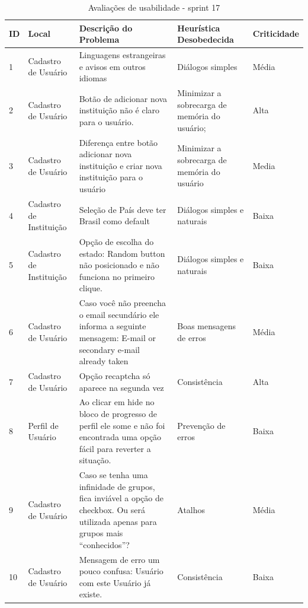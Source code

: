 \begin{table}[h!]

\begin{tabular}{|l|p{3cm}|p{6cm}|p{3cm}|l|}
\hline
\textbf{ID} & \textbf{Local} & \textbf{Descrição do Problema}                                                                                     & \textbf{Heurística Desobedecida} & \textbf{Criticidade} \\ \hline
1           & Cadastro de Usuário                 & Linguagens estrangeiras e avisos em outros idiomas & Diálogos simples  & Média                \\ \hline
2           & Cadastro de Usuário      & Botão de adicionar nova instituição não é claro para o usuário.  & Minimizar a sobrecarga de memória do usuário;           & Alta                \\ \hline
3           & Cadastro de Usuário               & Diferença entre botão adicionar nova instituição e criar nova instituição para o usuário  & Minimizar a sobrecarga de memória do usuário & Media                \\ \hline
4           & Cadastro de Instituição             & Seleção de País deve ter Brasil como default  & Diálogos simples e naturais    & Baixa                \\ \hline
5           & Cadastro de Instituição      & Opção de escolha do estado: Random button não posicionado e não funciona no primeiro clique. & Diálogos simples e naturais  & Baixa                \\ \hline
6           & Cadastro de Usuário  & Caso você não preencha o email secundário ele informa a seguinte mensagem: E-mail or secondary e-mail already taken & Boas mensagens de erros                & Média                \\ \hline
7           & Cadastro de Usuário  & Opção recaptcha só aparece na segunda vez & Consistência                     & Alta                \\ \hline
8           & Perfil de Usuário  & Ao clicar em hide no bloco de progresso de perfil ele some e não foi encontrada uma opção fácil para reverter a situação.
 & Prevenção de erros                     & Baixa                \\ \hline
9           & Cadastro de Usuário  & Caso se tenha uma infinidade de grupos, fica inviável a opção de checkbox. Ou será utilizada apenas para grupos mais ``conhecidos''? & Atalhos & Média                \\ \hline
10           & Cadastro de Usuário  & Mensagem de erro um pouco confusa: Usuário com este Usuário já existe.  & Consistência                     & Baixa                \\ \hline
\end{tabular}
\caption{Avaliações de usabilidade - sprint 17}
\label{tabela_1a}
\end{table}

